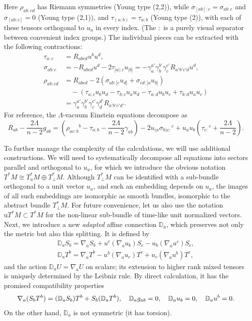 \documentclass[a4paper]{article}
\theoremstyle{remark}
\newcommand{\La}{\Lambda}
\newcommand{\D}{\mathbb{D}}
\begin{document}
Here $\rho_{ab:cd}$ has Riemann symmetries (Young type (2,2)), while
$\sigma_{[ab]:c} = \sigma_{ab:c}$ and $\sigma_{[ab:c]} = 0$ (Young type
(2,1)), and $\tau_{(a:b)} = \tau_{a:b}$ (Young type (2)), with each of
these tensors orthogonal to $u_a$ in every index. (The $:$ is a purely
visual separator between convenient index groups.) The individual pieces
can be extracted with the following contractions:
\begin{align*}
	\tau_{a:c} &= R_{abcd} u^b u^d , \\
	\sigma_{ab:c} &= -R_{abcd} u^d - 2\tau_{[a|:c} u_{|b]}
		= -\gamma_a^{a'} \gamma_b^{b'} \gamma_c^{c'} R_{a'b'c'd} u^d , \\
	\rho_{ab:cd} &= R_{abcd}
		- 2(\sigma_{ab:[c} u_{d]} + \sigma_{cd:[a} u_{b]})
	\\ & \quad {}
		- (\tau_{a:c} u_b u_d - \tau_{b:c} u_a u_d
		 - \tau_{a:d} u_b u_c + \tau_{b:d} u_a u_c)
	\\
	&= \gamma_a^{a'} \gamma_b^{b'} \gamma_c^{c'} \gamma_d^{d'} R_{a'b'c'd'} .
\end{align*}
For reference, the $\La$-vacuum Einstein equations decompose as
\begin{equation} \label{eq:lambda-vacuum}
	R_{ab} - \frac{2\La}{n-2} g_{ab}
	= \left(\rho_{ac:b}{}^b - \tau_{a:b} - \frac{2\La}{n-2} \gamma_{ab}\right)
		- 2 u_{(a} \sigma_{b)c:}{}^c
		+ u_a u_{b} \left(\tau_{c:}{}^c + \frac{2\La}{n-2}\right)
	.
\end{equation}

To further manage the complexity of the calculations, we will use
additional constructions. We will need to systematically decompose all
equations into sectors parallel and orthogonal to $u_a$, for which we
introduce the obvious notation $T^*M \cong T_u^*M \oplus T_{\perp}^*M$.
Although $T_{\perp}^*M$ can be identified with a sub-bundle orthogonal
to a unit vector $u_a$, and such an embedding depends on $u_a$, the
images of all such embeddings are isomorphic as smooth bundles,
isomorphic to the abstract bundle $T_{\perp}^*M$. For future
convenience, let us also use the notation $\mathrm{u}T^*M \subset T^*M$
for the non-linear sub-bundle of time-like unit normalized vectors. Next,
we introduce a new \emph{adapted} affine connection $\D_a$, which
preserves not only the metric but also this splitting. It is defined by
\begin{equation} \label{eq:D}
\begin{aligned}
	\D_a S_b = \nabla_a S_b + u^c (\nabla_a u_b) S_c - u_b (\nabla_a u^c) S_c ,
	\\
	\D_a T^b = \nabla_a T^b - u^b (\nabla_a u_c) T^c + u_c (\nabla_a u^b) T^c ,
\end{aligned}
\end{equation}
and the action $\D_a U = \nabla_a U$ on scalars; its extension to higher
rank mixed tensors is uniquely determined by the Leibniz rule. By direct
calculation, it has the promised compatibility properties
\begin{equation}
	\nabla_a (S_b T^b) = (\D_a S_b) T^b + S_b (\D_a T^b) ,
	\quad
	\D_a g_{ab} = 0 ,
	\quad
	\D_a u_b = 0 , \\
	\quad
	\D_a u^b = 0 .
\end{equation}
On the other hand, $\D_a$ is not symmetric (it has torsion). 
\end{document}
